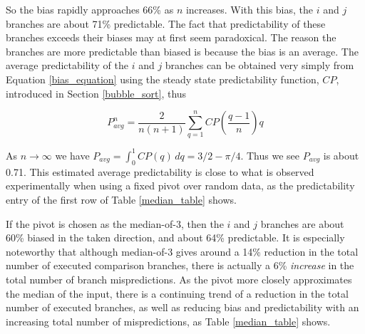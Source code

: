 \documentclass[acmtocl]{acmtrans2m}
\begin{document}
\noindent
So the bias rapidly approaches 66\% as $n$ increases. With this bias, the $i$
and $j$ branches are about 71\% predictable.  The fact that predictability of
these branches exceeds their biases may at first seem paradoxical. The reason
the branches are more predictable than biased is because the bias is an average.
The average predictability of the $i$ and $j$ branches can be obtained very
simply from Equation \ref{bias_equation} using the steady state predictability
function, $CP$, introduced in Section \ref{bubble_sort}, thus 

\[
P_{avg}^n = \frac{2}{n(n + 1)}\sum_{q = 1}^n CP\left( \frac{q - 1}{n} \right) q
\]

\noindent 
As $n \rightarrow \infty$ we have 
$P_{avg} = \int_0^1 CP(q)\,dq = 3/2 - \pi/4$.  Thus we see $P_{avg}$ is about
0.71. This estimated average predictability is close to what is observed
experimentally when using a fixed pivot over random data, as the predictability
entry of the first row of Table \ref{median_table} shows.

If the pivot is chosen as the median-of-3, then the $i$ and $j$ branches are
about 60\% biased in the taken direction, and about 64\% predictable. It is
especially noteworthy that although median-of-3 gives around a 14\% reduction in
the total number of executed comparison branches, there is actually a 6\%
\textit{increase} in the total number of branch mispredictions. As the pivot
more closely approximates the median of the input, there is a continuing trend
of a reduction in the total number of executed branches, as well as reducing
bias and predictability with an increasing total number of mispredictions, as
Table \ref{median_table} shows.
\end{document}
